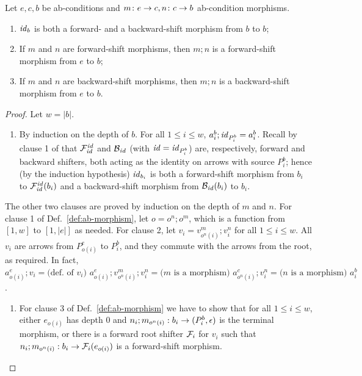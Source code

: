 \begin{lemma}
Let $e,c,b$ be ab-conditions and $m\colon e\rightarrow c, n\colon c\rightarrow b$ ab-condition morphisms.
\begin{enumerate}[topsep=\smallskipamount]
\item $\mathit{id}_b$ is both a forward- and a backward-shift morphism from $b$ to $b$;
\item If $m$ and $n$ are forward-shift morphisms, then $m;n$ is a forward-shift morphism from $e$ to $b$;
\item If $m$ and $n$ are backward-shift morphisms, then $m;n$ is a backward-shift morphism from $e$ to $b$.
\end{enumerate}
\end{lemma}
%
\begin{fullorname}
\begin{proof}
Let $w=|b|$.
%
\begin{enumerate}[topsep=\smallskipamount]
\item By induction on the depth of $b$. For all $1\leq i\leq w$, $a^b_i;\mathit{id}_{P^b_i}=a^b_i$. Recall by clause 1 of  that $\mathcal{F}^{\mathit{id}}_{\mathit{id}}$ and $\mathcal{B}_{\mathit{id}}$ (with $\mathit{id}=\mathit{id}_{P^b_i}$) are, respectively, forward and backward shifters, both acting as the identity on arrows with source $P^b_i$; hence (by the induction hypothesis) $\mathit{id}_{b_i}$ is both a forward-shift morphism from $b_i$ to $\mathcal{F}^{\mathit{id}}_{\mathit{id}}(b_i)$ and a backward-shift morphism from  $\mathcal{B}_{\mathit{id}}(b_i)$ to $b_i$.
\end{enumerate}
%
The other two clauses are proved by induction on the depth of $m$ and $n$. For clause 1 of Def.~\ref{def:ab-morphism}, let $o=o^n;o^m$, which is a function from $[1,w]$ to $[1,|e|]$ as needed. For clause 2, let $v_i=v^m_{o^n(i)};v^n_i$ for all $1\leq i\leq w$. All $v_i$ are arrows from $P^e_{o(i)}$ to $P^b_i$, and they commute with the arrows from the root, as required. In fact, $a^e_{o(i)};v_i =\text{(def.~of $v_i$) } a^e_{o(i)};v^m_{o^n(i)};v^n_i  =\text{($m$ is a morphism) }  a^c_{o^n(i)} ; v^n_i =\text{($n$ is a morphism) }  a^b_i$.
%
\begin{enumerate}[resume]
\item
For clause 3 of Def.~\ref{def:ab-morphism} we have to show that for all $1\leq i\leq w$, either $e_{o(i)}$ has depth 0 and $n_i;m_{o^n(i)}: b_i \rightarrow (P^b_i,\epsilon)$ is the terminal morphism, or there is a forward root shifter $\mathcal{F}_i$ for $v_i$ such that $n_i;m_{o^n(i)}:b_i \rightarrow \mathcal{F}_i(e_{o(i)})$ is a forward-shift morphism. 


\end{enumerate}
\end{proof}
\end{fullorname}
